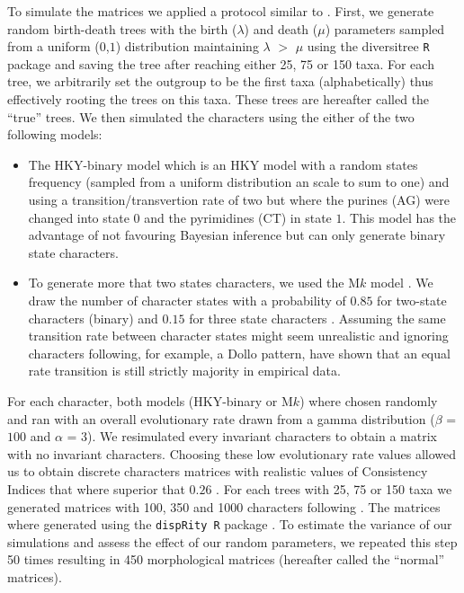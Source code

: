 \documentclass[12pt,letterpaper]{article}
\begin{document}
To simulate the matrices we applied a protocol similar to \citep{Guillerme2016146}.
First, we generate random birth-death trees with the birth ($\lambda$) and death ($\mu$) parameters sampled from a uniform ($0$,$1$) distribution maintaining $\lambda$ $>$ $\mu$ using the diversitree \texttt{R} package \citep[v0.9-8;][]{fitzjohndiversitree2012} and saving the tree after reaching either 25, 75 or 150 taxa.
For each tree, we arbitrarily set the outgroup to be the first taxa (alphabetically) thus effectively rooting the trees on this taxa.
These trees are hereafter called the ``true'' trees.
We then simulated the characters using the either of the two following models:
\begin{itemize}
    \item The HKY-binary model \citep{OReilly20160081} which is an HKY model \citep{HKY85} with a random states frequency (sampled from a uniform distribution an scale to sum to one) and using a transition/transvertion rate of two \citep{douadycomparison2003} but where the purines (AG) were changed into state $0$ and the pyrimidines (CT) in state $1$.
    This model has the advantage of not favouring Bayesian inference \citep[since it doesn't use a M$k$ model;][]{OReilly20160081} but can only generate binary state characters.
    \item To generate more that two states characters, we used the M$k$ model \citep{lewisa2001}.
    We draw the number of character states with a probability of $0.85$ for two-state characters (binary) and $0.15$ for three state characters \citep{Guillerme2016146}.
    Assuming the same transition rate between character states might seem unrealistic and ignoring characters following, for example, a Dollo pattern, \cite{Wright01072016} have shown that an equal rate transition is still strictly majority in empirical data.
\end{itemize}

For each character, both models (HKY-binary or M$k$) where chosen randomly and ran with an overall evolutionary rate drawn from a gamma distribution ($\beta$ = $100$ and $\alpha$ = $3$).
We resimulated every invariant characters to obtain a matrix with no invariant characters.
Choosing these low evolutionary rate values allowed us to obtain discrete characters matrices with realistic values of Consistency Indices that where superior that $0.26$ \citep{OReilly20160081}.
For each trees with 25, 75 or 150 taxa we generated matrices with 100, 350 and 1000 characters following \cite{OReilly20160081}.
The matrices where generated using the \texttt{dispRity R} package \citep[][; \url{https://github.com/TGuillerme/dispRity}]{thomas_guillerme_2016_55646}.
To estimate the variance of our simulations and assess the effect of our random parameters, we repeated this step 50 times resulting in 450 morphological matrices (hereafter called the ``normal'' matrices).
\end{document}
